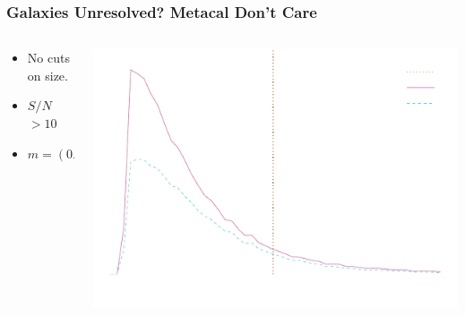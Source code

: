\documentclass{beamer}
\newcommand{\snr}{$S/N$}
\begin{document}
\frame
{
    \frametitle{Galaxies Unresolved?  Metacal Don't Care}
 
 
    \begin{columns}
        \begin{column}{0.5\textwidth}
            \begin{itemize}
                \item No cuts on size.
                \item \snr$ > 10$
                \item {\color{gold}$m = (0.03 \pm 0.31) \times 10^{-3}$}
            \end{itemize}
        \end{column}
        \begin{column}{0.5\textwidth}
            \begin{center}
                \includegraphics[width=\columnwidth]{run-bdj03mcal01-r50-inv.pdf}
                \newline
            \end{center}
        \end{column}
    \end{columns}


}
\end{document}
